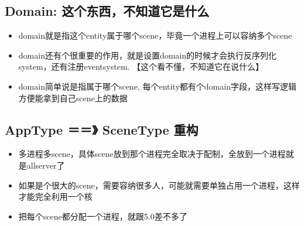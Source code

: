 \documentclass[9pt, b5paper]{article}
\begin{document}
\subsection{Domain: 这个东西，不知道它是什么}
\label{sec-11-2}
\begin{itemize}
\item domain就是指这个entity属于哪个scene，毕竟一个进程上可以容纳多个scene
\item domain还有个很重要的作用，就是设置domain的时候才会执行反序列化system，还有注册eventsystem. 【这个看不懂，不知道它在说什么】
\item domain简单说是指属于哪个scene, 每个entity都有个domain字段，这样写逻辑方便能拿到自己scene上的数据
\end{itemize}
\subsection{AppType ＝＝》 SceneType 重构}
\label{sec-11-3}
\begin{itemize}
\item 多进程多scene，具体scene放到那个进程完全取决于配制，全放到一个进程就是allserver了
\item 如果是个很大的scene，需要容纳很多人，可能就需要单独占用一个进程，这样才能完全利用一个核
\item 把每个scene都分配一个进程，就跟5.0差不多了
\end{itemize}
\end{document}
